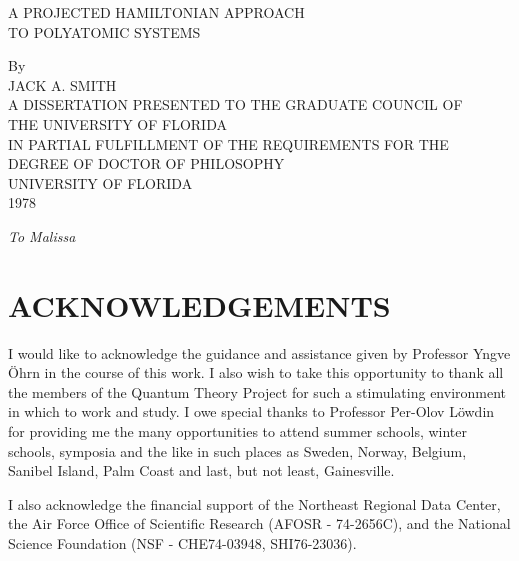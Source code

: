 \documentclass[12pt,letterpaper]{report}
\begin{document}
\begin{titlepage}
    \centering
    \vspace*{1in}
    {\LARGE A PROJECTED HAMILTONIAN APPROACH\\[0.2in]
    TO POLYATOMIC SYSTEMS\\[1in]}
    
    By\\[0.5in]
    
    {\large JACK A. SMITH}\\[1in]
    
    A DISSERTATION PRESENTED TO THE GRADUATE COUNCIL OF\\
    THE UNIVERSITY OF FLORIDA\\
    IN PARTIAL FULFILLMENT OF THE REQUIREMENTS FOR THE\\
    DEGREE OF DOCTOR OF PHILOSOPHY\\[1in]
    
    UNIVERSITY OF FLORIDA\\[0.3in]
    1978
\end{titlepage}

\newpage
\thispagestyle{empty}
\vspace*{3in}
\begin{center}
\textit{To Malissa}
\end{center}

\newpage
\chapter*{ACKNOWLEDGEMENTS}

I would like to acknowledge the guidance and assistance given by Professor Yngve Öhrn in the course of this work. I also wish to take this opportunity to thank all the members of the Quantum Theory Project for such a stimulating environment in which to work and study. I owe special thanks to Professor Per-Olov Löwdin for providing me the many opportunities to attend summer schools, winter schools, symposia and the like in such places as Sweden, Norway, Belgium, Sanibel Island, Palm Coast and last, but not least, Gainesville.

I also acknowledge the financial support of the Northeast Regional Data Center, the Air Force Office of Scientific Research (AFOSR - 74-2656C), and the National Science Foundation (NSF - CHE74-03948, SHI76-23036).

\tableofcontents
\end{document}

